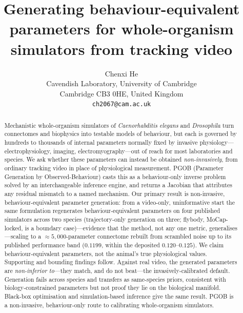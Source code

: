 \documentclass[11pt]{article}
\title{Generating behaviour-equivalent parameters for whole-organism simulators from tracking video}
\author{
 Chenxi He \\
 Cavendish Laboratory, University of Cambridge \\
 Cambridge CB3 0HE, United Kingdom \\
 \texttt{ch2067@cam.ac.uk}
}
\date{}
\begin{document}
\maketitle

\begin{abstract}
\noindent
Mechanistic whole-organism simulators of \emph{Caenorhabditis elegans} and \emph{Drosophila} turn connectomes and biophysics into testable models of behaviour, but each is governed by hundreds to thousands of internal parameters normally fixed by invasive physiology---electrophysiology, imaging, electromyography---out of reach for most laboratories and species. We ask whether these parameters can instead be obtained \emph{non-invasively}, from ordinary tracking video in place of physiological measurement. PGOB (Parameter Generation by Observed-Behaviour) casts this as a behaviour-only inverse problem solved by an interchangeable inference engine, and returns a Jacobian that attributes any residual mismatch to a named mechanism. Our primary result is non-invasive, behaviour-equivalent parameter generation: from a video-only, uninformative start the same formulation regenerates behaviour-equivalent parameters on four published simulators across two species (trajectory-only generation on three; flybody, MoCap-locked, is a boundary case)---evidence that the method, not any one metric, generalises---scaling to a ${\approx}5{,}000$-parameter connectome rebuilt from scrambled noise up to its published performance band ($0.1199$, within the deposited $0.120$--$0.125$). We claim behaviour-equivalent parameters, not the animal's true physiological values. Supporting and bounding findings follow. Against real video, the generated parameters are \emph{non-inferior to}---they match, and do not beat---the invasively-calibrated default. Generation fails across species and transfers as same-species priors, consistent with biology-constrained parameters but not proof they lie on the biological manifold. Black-box optimisation and simulation-based inference give the same result. PGOB is a non-invasive, behaviour-only route to calibrating whole-organism simulators.
\end{abstract}
\end{document}
